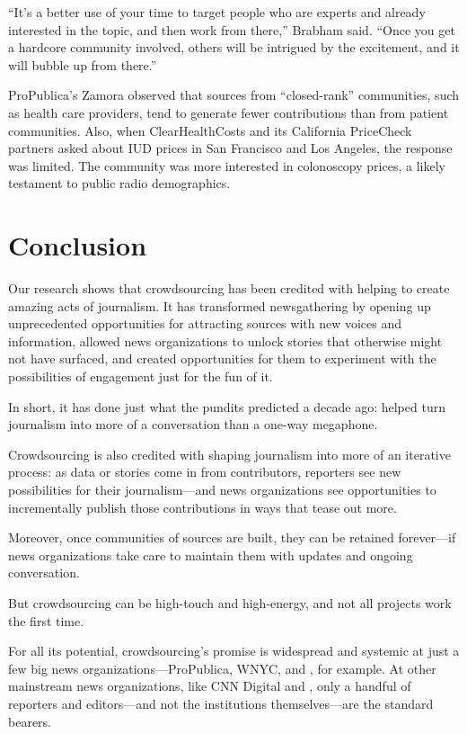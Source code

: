 \begin{itemize}
``It’s a better use of your time to target people who are experts and already interested in the topic, and then work from there,'' Brabham said. ``Once you get a hardcore community involved, others will be intrigued by the excitement, and it will bubble up from there.''\autocite{BrabhamAmateur}

ProPublica’s Zamora observed that sources from ``closed-rank'' communities, such as health care providers, tend to generate fewer contributions than from patient communities. Also, when ClearHealthCosts and its California PriceCheck partners asked about IUD prices in San Francisco and Los Angeles, the response was limited. The community was more interested in colonoscopy prices, a likely testament to public radio demographics.\autocite{Aliferis}

\chapter{Conclusion} 

Our research shows that crowdsourcing has been credited with helping to create amazing acts of journalism. It has transformed newsgathering by opening up unprecedented opportunities for attracting sources with new voices and information, allowed news organizations to unlock stories that otherwise might not have surfaced, and created opportunities for them to experiment with the possibilities of engagement just for the fun of it.

In short, it has done just what the pundits predicted a decade ago: helped turn journalism into more of a conversation than a one-way megaphone. 

Crowdsourcing is also credited with shaping journalism into more of an iterative process: as data or stories come in from contributors, reporters see new possibilities for their journalism---and news organizations see opportunities to incrementally publish those contributions in ways that tease out more. 

Moreover, once communities of sources are built, they can be retained forever---if news organizations take care to maintain them with updates and ongoing conversation.

But crowdsourcing can be high-touch and high-energy, and not all projects work the first time. 

For all its potential, crowdsourcing’s promise is widespread and systemic at just a few big news organizations---ProPublica, WNYC, and , for example. At other mainstream news organizations, like CNN Digital and , only a handful of reporters and editors---and not the institutions themselves---are the standard bearers. 


\end{itemize}
